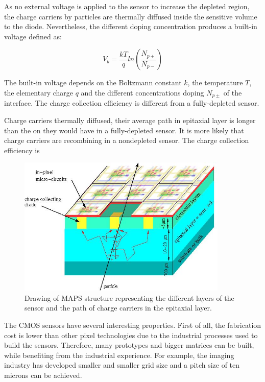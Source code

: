     As no external voltage is applied to the sensor to increase the depleted region, the charge carriers by particles are thermally diffused inside the sensitive volume to the diode.
    Nevertheless, the different doping concentration produces a built-in voltage defined as: 

    \begin{equation}
      V_b = \frac{kT}{q}ln\left( \frac{N_{p+}}{N_{p-}}\right)
    \end{equation}
    
    The built-in voltage depends on the Boltzmann constant $k$, the temperature $T$, the elementary charge $q$ and the different concentrations doping $N_{p\pm}$ of the interface.
    The charge collection efficiency is different from a fully-depleted sensor. 

    Charge carriers thermally diffused, their average path in epitaxial layer is longer than the on they would have in a fully-depleted sensor.
    It is more likely that charge carriers are recombining in a nondepleted sensor. 
    The charge collection efficiency is 

    \begin{figure}[!h]
      \centering
      \includegraphics[width = 10cm]{Pictures/vxd/principeMapsMIP.jpg}
      \caption{Drawing of MAPS structure representing the different layers of the sensor and the path of charge carriers in the epitaxial layer.}
      \label{fig:principleMaps}
    \end{figure}

    The \gls{CMOS} sensors have several interesting properties.
    First of all, the fabrication cost is lower than other pixel technologies due to the industrial processes used to build the sensors.
    Therefore, many prototypes and bigger matrices can be built, while benefiting from the industrial experience.
    For example, the imaging industry has developed smaller and smaller grid size and a pitch size of ten microns can be achieved.
    
